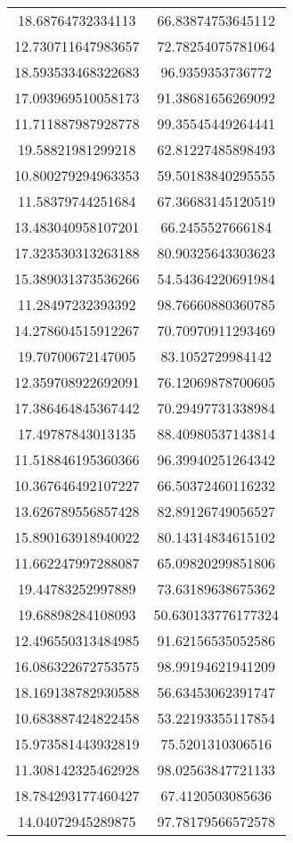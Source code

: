 \begin{table}
\begin{tabular}{cc}
18.68764732334113 & 66.83874753645112 \\
12.730711647983657 & 72.78254075781064 \\
18.593533468322683 & 96.9359353736772 \\
17.093969510058173 & 91.38681656269092 \\
11.711887987928778 & 99.35545449264441 \\
19.58821981299218 & 62.81227485898493 \\
10.800279294963353 & 59.50183840295555 \\
11.58379744251684 & 67.36683145120519 \\
13.483040958107201 & 66.2455527666184 \\
17.323530313263188 & 80.90325643303623 \\
15.389031373536266 & 54.54364220691984 \\
11.28497232393392 & 98.76660880360785 \\
14.278604515912267 & 70.70970911293469 \\
19.70700672147005 & 83.1052729984142 \\
12.359708922692091 & 76.12069878700605 \\
17.386464845367442 & 70.29497731338984 \\
17.49787843013135 & 88.40980537143814 \\
11.518846195360366 & 96.39940251264342 \\
10.367646492107227 & 66.50372460116232 \\
13.626789556857428 & 82.89126749056527 \\
15.890163918940022 & 80.14314834615102 \\
11.662247997288087 & 65.09820299851806 \\
19.44783252997889 & 73.63189638675362 \\
19.68898284108093 & 50.630133776177324 \\
12.496550313484985 & 91.62156535052586 \\
16.086322672753575 & 98.99194621941209 \\
18.169138782930588 & 56.63453062391747 \\
10.683887424822458 & 53.22193355117854 \\
15.973581443932819 & 75.5201310306516 \\
11.308142325462928 & 98.02563847721133 \\
18.784293177460427 & 67.4120503085636 \\
14.04072945289875 & 97.78179566572578 \\

\end{tabular}
\end{table}
